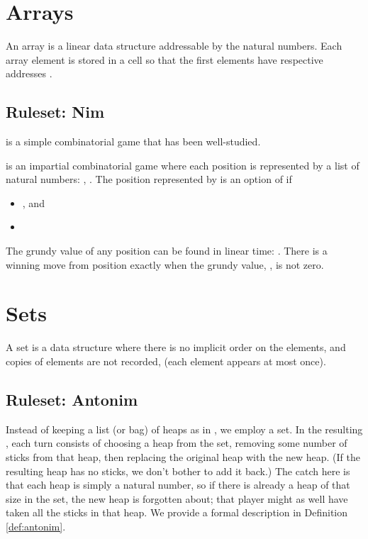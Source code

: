 \documentclass[letter,10pt]{article}
\begin{document}
\section{Arrays}
\label{section:arrays}

An array is a linear data structure addressable by the natural numbers.  Each array element is stored in a cell so that the first  elements have respective addresses .  

\subsection{Ruleset: Nim}

 is a simple combinatorial game that has been well-studied\cite{Bouton:1901}.  
\begin{definition}[Nim]
	\label{def:nim}
	 is an impartial combinatorial game where each position is represented by a list of natural numbers: , .  The position represented by  is an option of  if 
	\begin{itemize}
		\item , and
		\item 
	\end{itemize} 
\end{definition}

The grundy value of any  position can be found in linear time: .  There is a winning move from position  exactly when the grundy value, , is not zero.\cite{Bouton:1901}

\section{Sets}
\label{section:sets}

A set is a data structure where there is no implicit order on the elements, and copies of elements are not recorded, (each element appears at most once).  

\subsection{Ruleset: Antonim}

Instead of keeping a list (or bag) of heaps as in , we employ a set.  In the resulting , each turn consists of choosing a heap from the set, removing some number of sticks from that heap, then replacing the original heap with the new heap.  (If the resulting heap has no sticks, we don't bother to add it back.)  The catch here is that each heap is simply a natural number, so if there is already a heap of that size in the set, the new heap is forgotten about; that player might as well have taken all the sticks in that heap.  We provide a formal description in Definition \ref{def:antonim}.
\end{document}
